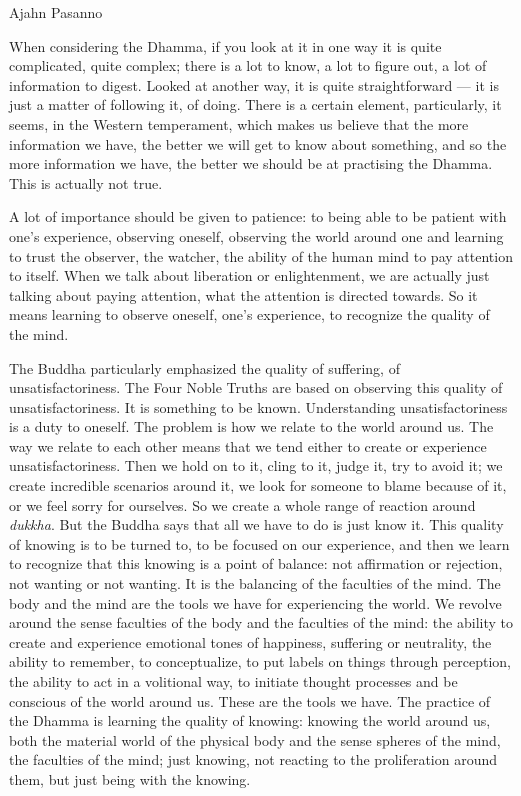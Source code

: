 
Ajahn Pasanno

When considering the Dhamma, if you look at it in one way it is quite
complicated, quite complex; there is a lot to know, a lot to figure out,
a lot of information to digest. Looked at another way, it is quite
straightforward --- it is just a matter of following it, of doing. There
is a certain element, particularly, it seems, in the Western
temperament, which makes us believe that the more information we have,
the better we will get to know about something, and so the more
information we have, the better we should be at practising the Dhamma.
This is actually not true.

A lot of importance should be given to patience: to being able to be
patient with one's experience, observing oneself, observing the world
around one and learning to trust the observer, the watcher, the ability
of the human mind to pay attention to itself. When we talk about
liberation or enlightenment, we are actually just talking about paying
attention, what the attention is directed towards. So it means learning
to observe oneself, one's experience, to recognize the quality of the
mind.

The Buddha particularly emphasized the quality of suffering, of
unsatisfactoriness. The Four Noble Truths are based on observing this
quality of unsatisfactoriness. It is something to be known.
Understanding unsatisfactoriness is a duty to oneself. The problem is
how we relate to the world around us. The way we relate to each other
means that we tend either to create or experience unsatisfactoriness.
Then we hold on to it, cling to it, judge it, try to avoid it; we create
incredible scenarios around it, we look for someone to blame because of
it, or we feel sorry for ourselves. So we create a whole range of
reaction around \emph{dukkha}. But the Buddha says that all we have to
do is just know it. This quality of knowing is to be turned to, to be
focused on our experience, and then we learn to recognize that this
knowing is a point of balance: not affirmation or rejection, not wanting
or not wanting. It is the balancing of the faculties of the mind. The
body and the mind are the tools we have for experiencing the world. We
revolve around the sense faculties of the body and the faculties of the
mind: the ability to create and experience emotional tones of happiness,
suffering or neutrality, the ability to remember, to conceptualize, to
put labels on things through perception, the ability to act in a
volitional way, to initiate thought processes and be conscious of the
world around us. These are the tools we have. The practice of the Dhamma
is learning the quality of knowing: knowing the world around us, both
the material world of the physical body and the sense spheres of the
mind, the faculties of the mind; just knowing, not reacting to the
proliferation around them, but just being with the knowing.

